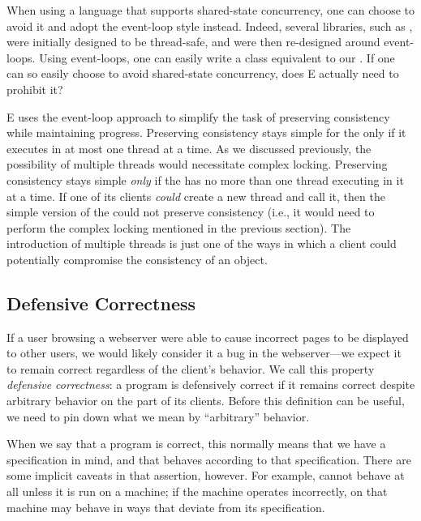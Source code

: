 \documentclass{llncs}
\begin{document}
When using a language that supports shared-state concurrency, one can
choose to avoid it and adopt the event-loop style instead. Indeed,
several  libraries, such as , were initially
designed to be thread-safe, and were then re-designed around
event-loops. Using event-loops, one can easily write a 
class equivalent to our .  If one can so easily
choose to avoid shared-state concurrency, does E actually need to
prohibit it?

E uses the event-loop approach to simplify the task of preserving
consistency while maintaining progress. Preserving consistency stays
simple for the  only if it executes in at most one
thread at a time.  As we discussed previously, the possibility of
multiple threads would necessitate complex locking. Preserving
consistency stays simple \emph{only} if the  has no
more than one thread executing in it at a time.  If one of its clients
\emph{could} create a new thread and call it, then the simple version
of the  could not preserve consistency (i.e., it
would need to perform the complex locking mentioned in the previous
section). The introduction of multiple threads is just one of the ways
in which a client could potentially compromise the consistency of an
object.

\subsection{Defensive Correctness}

If a user browsing a webserver were able to cause incorrect pages to
be displayed to other users, we would likely consider it a bug in the
webserver---we expect it to remain correct regardless of the client's
behavior.  We call this property \emph{defensive correctness}: a
program  is defensively correct if it remains correct despite
arbitrary behavior on the part of its clients.  Before this definition
can be useful, we need to pin down what we mean by ``arbitrary''
behavior.

When we say that a program  is correct, this normally means
that we have a specification in mind, and that  behaves
according to that specification.  There are some implicit caveats in
that assertion, however. For example,  cannot behave at all
unless it is run on a machine; if the machine operates incorrectly,
 on that machine may behave in ways that deviate from its
specification.  
\end{document}
